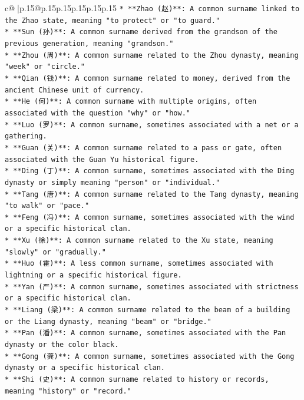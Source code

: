 \documentclass{article}
\begin{document}
{\begin{supertabular}{c@{$\;$}|p{.15\linewidth}@{}p{.15\linewidth}p{.15\linewidth}p{.15\linewidth}p{.15\linewidth}p{.15\linewidth}}
{{{\texttt{*   **Zhao (赵)**: A common surname linked to the Zhao state, meaning "to protect" or "to guard."} \\
\texttt{*   **Sun (孙)**: A common surname derived from the grandson of the previous generation, meaning "grandson."} \\
\texttt{*   **Zhou (周)**: A common surname related to the Zhou dynasty, meaning "week" or "circle."} \\
\texttt{*   **Qian (钱)**: A common surname related to money, derived from the ancient Chinese unit of currency.} \\
\texttt{*   **He (何)**: A common surname with multiple origins, often associated with the question "why" or "how."} \\
\texttt{*   **Luo (罗)**: A common surname, sometimes associated with a net or a gathering.} \\
\texttt{*   **Guan (关)**: A common surname related to a pass or gate, often associated with the Guan Yu historical figure.} \\
\texttt{*   **Ding (丁)**: A common surname, sometimes associated with the Ding dynasty or simply meaning "person" or "individual."} \\
\texttt{*   **Tang (唐)**: A common surname related to the Tang dynasty, meaning "to walk" or "pace."} \\
\texttt{*   **Feng (冯)**: A common surname, sometimes associated with the wind or a specific historical clan.} \\
\texttt{*   **Xu (徐)**: A common surname related to the Xu state, meaning "slowly" or "gradually."} \\
\texttt{*   **Huo (霍)**: A less common surname, sometimes associated with lightning or a specific historical figure.} \\
\texttt{*   **Yan (严)**: A common surname, sometimes associated with strictness or a specific historical clan.} \\
\texttt{*   **Liang (梁)**: A common surname related to the beam of a building or the Liang dynasty, meaning "beam" or "bridge."} \\
\texttt{*   **Pan (潘)**: A common surname, sometimes associated with the Pan dynasty or the color black.} \\
\texttt{*   **Gong (龚)**: A common surname, sometimes associated with the Gong dynasty or a specific historical clan.} \\
\texttt{*   **Shi (史)**: A common surname related to history or records, meaning "history" or "record."} \\
}}}
\end{supertabular}}
\end{document}
